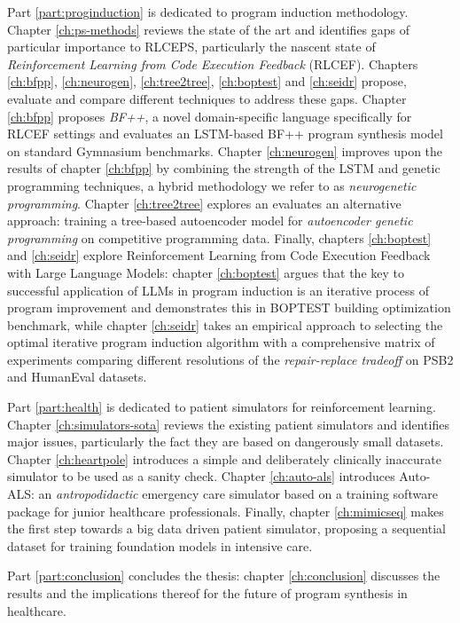 Part \ref{part:proginduction} is dedicated to program induction methodology.
Chapter \ref{ch:ps-methods} reviews the state of the art and identifies gaps of particular importance to RLCEPS, particularly the nascent state of \emph{Reinforcement Learning from Code Execution Feedback} (RLCEF).
Chapters \ref{ch:bfpp}, \ref{ch:neurogen}, \ref{ch:tree2tree}, \ref{ch:boptest} and \ref{ch:seidr} propose, evaluate and compare different techniques to address these gaps.
Chapter \ref{ch:bfpp} proposes \emph{BF++}, a novel domain-specific language specifically for RLCEF settings and evaluates an LSTM-based BF++ program synthesis model on standard Gymnasium \cite{towersGymnasiumStandardInterface2024} benchmarks.
Chapter \ref{ch:neurogen} improves upon the results of chapter \ref{ch:bfpp} by combining the strength of the LSTM and genetic programming techniques, a hybrid methodology we refer to as \emph{neurogenetic programming}.
Chapter \ref{ch:tree2tree} explores an evaluates an alternative approach: training a tree-based autoencoder model for \emph{autoencoder genetic programming} on competitive programming data.
Finally, chapters \ref{ch:boptest} and \ref{ch:seidr} explore Reinforcement Learning from Code Execution Feedback with Large Language Models: chapter \ref{ch:boptest} argues that the key to successful application of LLMs in program induction is an iterative process of program improvement and demonstrates this in BOPTEST building optimization benchmark, while chapter \ref{ch:seidr} takes an empirical approach to selecting the optimal iterative program induction algorithm with a comprehensive matrix of experiments comparing different resolutions of the \emph{repair-replace tradeoff} on PSB2 and HumanEval datasets.

Part \ref{part:health} is dedicated to patient simulators for reinforcement learning.
Chapter \ref{ch:simulators-sota} reviews the existing patient simulators and identifies major issues, particularly the fact they are based on dangerously small datasets.
Chapter \ref{ch:heartpole} introduces a simple and deliberately clinically inaccurate simulator to be used as a sanity check.
Chapter \ref{ch:auto-als} introduces Auto-ALS: an \emph{antropodidactic} emergency care simulator based on a training software package for junior healthcare professionals.
Finally, chapter \ref{ch:mimicseq} makes the first step towards a big data driven patient simulator, proposing a sequential dataset for training foundation models in intensive care.

Part \ref{part:conclusion} concludes the thesis: chapter \ref{ch:conclusion} discusses the results and the implications thereof for the future of program synthesis in healthcare.